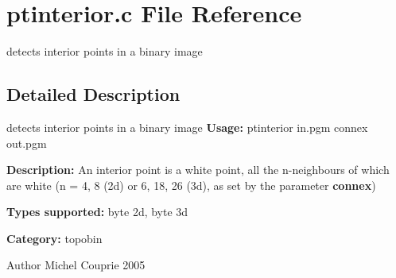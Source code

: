 \section{ptinterior.c File Reference}
\label{ptinterior_8c}


detects interior points in a binary image  




\subsection{Detailed Description}
detects interior points in a binary image {\bfseries Usage:} ptinterior in.pgm connex out.pgm

{\bfseries Description:} An interior point is a white point, all the n-\/neighbours of which are white (n = 4, 8 (2d) or 6, 18, 26 (3d), as set by the parameter {\bfseries connex})

{\bfseries Types supported:} byte 2d, byte 3d

{\bfseries Category:} topobin

\begin{DoxyAuthor}{Author}
Michel Couprie 2005 
\end{DoxyAuthor}

